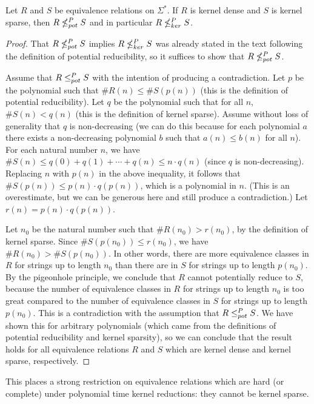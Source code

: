 \begin{theorem}\label{thm:density}
  Let $R$ and $S$ be equivalence relations on $\Sigma^*$.
  If $R$ is kernel dense and $S$ is kernel sparse, then $R\nleq^{P}_{pot} S$ and in particular $R\nleq^{P}_{ker} S$.
\end{theorem}
\begin{proof}
  That $R\nleq^{P}_{pot} S$ implies $R\nleq^{P}_{ker} S$ was already stated in the text following the definition of potential reducibility, so it suffices to show that $R\nleq^{P}_{pot} S$.

  Assume that $R\leq^{P}_{pot} S$ with the intention of producing a contradiction.
  Let $p$ be the polynomial such that $\#R(n)\leq \#S(p(n))$ (this is the definition of potential reducibility).
  Let $q$ be the polynomial such that for all $n$, $\#S(n)< q(n)$ (this is the definition of kernel sparse).
  Assume without loss of generality that $q$ is non-decreasing (we can do this because for each polynomial $a$ there exists a non-decreasing polynomial $b$ such that $a(n)\leq b(n)$ for all $n$).
  For each natural number $n$, we have $\#S(n) \leq q(0) + q(1) + \cdots + q(n) \leq n \cdot q(n)$ (since $q$ is non-decreasing).
  Replacing $n$ with $p(n)$ in the above inequality, it follows that $\#S(p(n)) \leq p(n) \cdot q(p(n))$, which is a polynomial in $n$.
  (This is an overestimate, but we can be generous here and still produce a contradiction.)
  Let $r(n)=p(n)\cdot q(p(n))$.

  Let $n_0$ be the natural number such that $\#R(n_0) > r(n_0)$, by the definition of kernel sparse.
  Since $\#S(p(n_0)) \leq r(n_0)$, we have $\#R(n_0) > \#S(p(n_0))$.
  In other words, there are more equivalence classes in $R$ for strings up to length $n_0$ than there are in $S$ for strings up to length $p(n_0)$.
  By the pigeonhole principle, we conclude that $R$ cannot potentially reduce to $S$, because the number of equivalence classes in $R$ for strings up to length $n_0$ is too great compared to the number of equivalence classes in $S$ for strings up to length $p(n_0)$.
  This is a contradiction with the assumption that $R\leq^{P}_{pot} S$.
  We have shown this for arbitrary polynomials (which came from the definitions of potential reducibility and kernel sparsity), so we can conclude that the result holds for all equivalence relations $R$ and $S$ which are kernel dense and kernel sparse, respectively.
\end{proof}

This places a strong restriction on equivalence relations which are hard (or complete) under polynomial time kernel reductions: they cannot be kernel sparse.

